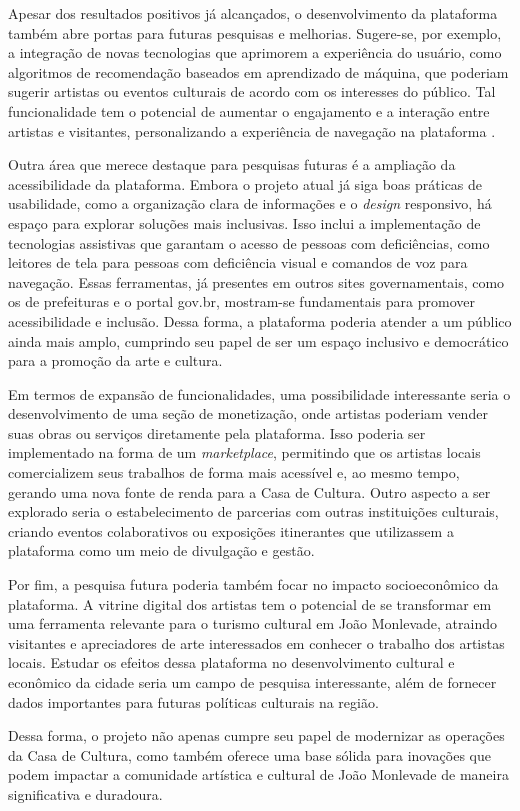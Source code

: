 Apesar dos resultados positivos já alcançados, o desenvolvimento da plataforma também abre portas para futuras pesquisas e melhorias. Sugere-se, por exemplo, a integração de novas tecnologias que aprimorem a experiência do usuário, como algoritmos de recomendação baseados em aprendizado de máquina, que poderiam sugerir artistas ou eventos culturais de acordo com os interesses do público. Tal funcionalidade tem o potencial de aumentar o engajamento e a interação entre artistas e visitantes, personalizando a experiência de navegação na plataforma \cite{xu2019semantic}.

Outra área que merece destaque para pesquisas futuras é a ampliação da acessibilidade da plataforma. Embora o projeto atual já siga boas práticas de usabilidade, como a organização clara de informações e o \textit{design} responsivo, há espaço para explorar soluções mais inclusivas. Isso inclui a implementação de tecnologias assistivas que garantam o acesso de pessoas com deficiências, como leitores de tela para pessoas com deficiência visual e comandos de voz para navegação. Essas ferramentas, já presentes em outros sites governamentais, como os de prefeituras e o portal gov.br, mostram-se fundamentais para promover acessibilidade e inclusão. Dessa forma, a plataforma poderia atender a um público ainda mais amplo, cumprindo seu papel de ser um espaço inclusivo e democrático para a promoção da arte e cultura.

Em termos de expansão de funcionalidades, uma possibilidade interessante seria o desenvolvimento de uma seção de monetização, onde artistas poderiam vender suas obras ou serviços diretamente pela plataforma. Isso poderia ser implementado na forma de um \textit{marketplace}, permitindo que os artistas locais comercializem seus trabalhos de forma mais acessível e, ao mesmo tempo, gerando uma nova fonte de renda para a Casa de Cultura. Outro aspecto a ser explorado seria o estabelecimento de parcerias com outras instituições culturais, criando eventos colaborativos ou exposições itinerantes que utilizassem a plataforma como um meio de divulgação e gestão.

Por fim, a pesquisa futura poderia também focar no impacto socioeconômico da plataforma. A vitrine digital dos artistas tem o potencial de se transformar em uma ferramenta relevante para o turismo cultural em João Monlevade, atraindo visitantes e apreciadores de arte interessados em conhecer o trabalho dos artistas locais. Estudar os efeitos dessa plataforma no desenvolvimento cultural e econômico da cidade seria um campo de pesquisa interessante, além de fornecer dados importantes para futuras políticas culturais na região.

Dessa forma, o projeto não apenas cumpre seu papel de modernizar as operações da Casa de Cultura, como também oferece uma base sólida para inovações que podem impactar a comunidade artística e cultural de João Monlevade de maneira significativa e duradoura.
